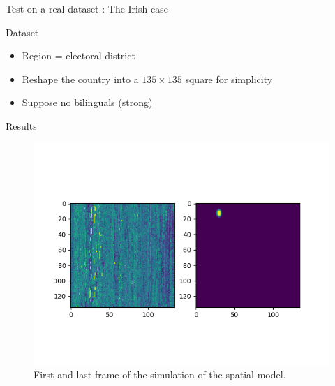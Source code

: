 \documentclass[10pt]{beamer}
\begin{document}
\begin{frame}{Test on a real dataset : The Irish case}

\begin{alertblock}{Dataset}
\begin{itemize}
\item Region = electoral district
\item Reshape the country into a $135 \times 135$ square for simplicity
\item Suppose no bilinguals (strong)
\end{itemize}
\end{alertblock}

\begin{exampleblock}{Results}
\begin{figure}[H]
\centering
\includegraphics[scale=0.28]{firstandlast_ir.png}
\caption{First and last frame of the simulation of the spatial model.}
\label{fig:firstandlast_ir}
\end{figure}
\end{exampleblock}

\end{frame}
\end{document}
